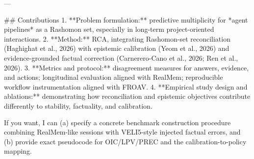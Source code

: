 ---

## Contributions  
1. **Problem formulation:** predictive multiplicity for *agent pipelines* as a Rashomon set, especially in long-term project-oriented interactions.  
2. **Method:** RCA, integrating Rashomon-set reconciliation (Haghighat et al., 2026) with epistemic calibration (Yeom et al., 2026) and evidence-grounded factual correction (Carnerero-Cano et al., 2026; Ren et al., 2026).  
3. **Metrics and protocol:** disagreement measures for answers, evidence, and actions; longitudinal evaluation aligned with RealMem; reproducible workflow instrumentation aligned with FROAV.  
4. **Empirical study design and ablations:** demonstrating how reconciliation and epistemic objectives contribute differently to stability, factuality, and calibration.

If you want, I can (a) specify a concrete benchmark construction procedure combining RealMem-like sessions with VELI5-style injected factual errors, and (b) provide exact pseudocode for OIC/LPV/PREC and the calibration-to-policy mapping.